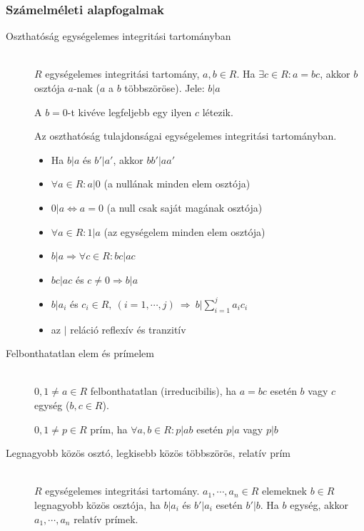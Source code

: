 \documentclass[margin=0px]{article}
\begin{document}
			\subsubsection{Számelméleti alapfogalmak}
				\begin{description}
					\item[Oszthatóság egységelemes integritási tartományban] \hfill \\
					$R$ egységelemes integritási tartomány, $a,b\in R$. Ha $\exists c\in R: a = bc$, akkor $b$ osztója  $a$-nak ($a$ a $b$ többszöröse). Jele: $b|a$
					
					A $b = 0$-t kivéve legfeljebb egy ilyen $c$ létezik.
					
					Az oszthatóság tulajdonságai egységelemes integritási tartományban.
					\begin{itemize}
						\item Ha $b|a$ és $b'|a'$, akkor $bb'|aa'$
						\item $\forall a\in R: a|0$ (a nullának minden elem osztója)
						\item $0|a \Leftrightarrow a = 0$ (a null csak saját magának osztója)
						\item $\forall a\in R: 1|a$ (az egységelem minden elem osztója)
						\item $b|a \Rightarrow \forall c \in R : bc|ac$
						\item $bc|ac$ és $c\neq0 \Rightarrow b|a$ 
						\item $b|a_i$ és $c_i \in R,\ (i = 1,\cdots,j) \ \Rightarrow \ b|\sum_{i=1}^{j}a_ic_i$
						\item az $|$ reláció reflexív és tranzitív
					\end{itemize}
					\item[Felbonthatatlan elem és prímelem] \hfill \\
						$0,1 \neq a \in R$ felbonthatatlan (irreducibilis), ha $a = bc$ esetén $b$ vagy $c$ egység ($b,c \in R$).
						
						$0,1 \neq p \in R$ prím, ha $\forall a,b \in R : p|ab$ esetén $p|a$ vagy $p|b$
					\item[Legnagyobb közös osztó, legkisebb közös többszörös, relatív prím] \hfill \\
						$R$ egységelemes integritási tartomány. $a_1,\cdots,a_n \in R$ elemeknek $b\in R$ legnagyobb közös osztója, ha $b|a_i$ és $b'|a_i$ esetén $b'|b$. Ha $b$ egység, akkor $a_1, \cdots , a_n$ relatív prímek.
						

\end{description}
\end{document}

